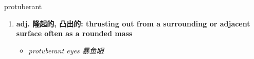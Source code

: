 
\begin{frame}
{\huge protuberant}
\begin{center}
\begin{enumerate}\Large
  \item \textbf{adj. 隆起的, 凸出的: thrusting out from a surrounding or adjacent surface often as a rounded mass}
  \begin{itemize}
    \item \em{\Large{protuberant eyes 暴鱼眼}}
  \end{itemize}
\end{enumerate}
\end{center}
\end{frame}
